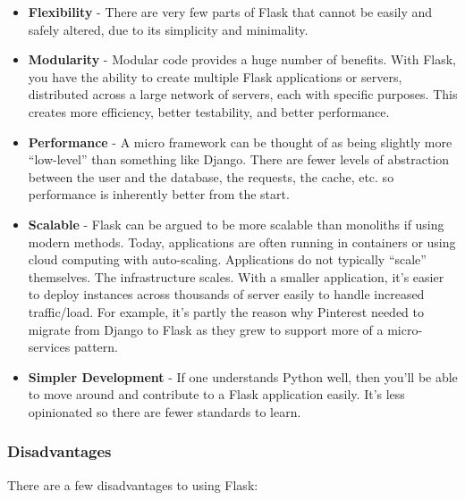 \begin{itemize}
    \item \textbf{Flexibility} - There are very few parts of Flask that cannot
    be easily and safely altered, due to its simplicity and minimality.
    \item \textbf{Modularity} - Modular code provides a huge number of benefits.
    With Flask, you have the ability to create multiple Flask applications or 
    servers, distributed across a large network of servers, each with specific 
    purposes. This creates more efficiency, better testability, and better 
    performance.
    \item \textbf{Performance} - A micro framework can be thought of as being 
    slightly more “low-level” than something like Django. There are fewer levels
    of abstraction between the user and the database, the requests, the cache, 
    etc. so performance is inherently better from the start.
    \item \textbf{Scalable} - Flask can be argued to be more scalable than 
    monoliths if using modern methods. Today, applications are often running in 
    containers or using cloud computing with auto-scaling. Applications do not 
    typically “scale” themselves. The infrastructure scales. With a smaller 
    application, it's easier to deploy instances across thousands of server 
    easily to handle increased traffic/load. For example, it's partly the reason
    why Pinterest needed to migrate from Django to Flask as they grew to support
    more of a micro-services pattern.
    \item \textbf{Simpler Development} - If one understands Python well, then 
    you’ll be able to move around and contribute to a Flask application easily. 
    It’s less opinionated so there are fewer standards to learn.
\end{itemize}

\subsubsection{Disadvantages}
There are a few disadvantages to using Flask:

